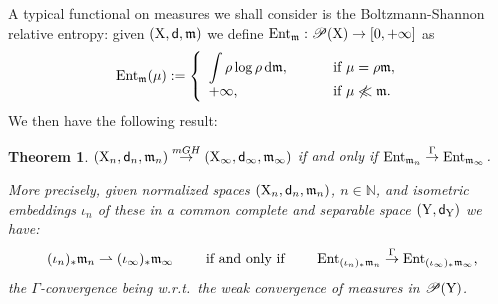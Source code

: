 \documentclass[11pt]{article}
\numberwithin{equation}{section}
\newtheorem{theorem}{Theorem}[section]
\newcommand{\N}{\mathbb{N}}
\newcommand{\pr}{\mathscr P}
\newcommand{\X}{{\rm X}}
\newcommand{\Y}{{\rm Y}}
\newcommand{\sfd}{{\sf d}}
\newcommand{\mm}{{\mathfrak m}}
\newcommand{\ent}{{\rm Ent}_\mm}
\newcommand{\entm}[1]{{\rm Ent}_{#1}}
\renewcommand{\d}{{\rm d}}
\newcommand{\weakto}{\rightharpoonup}
\begin{document}
A typical functional on measures we shall consider is the Boltzmann-Shannon relative entropy: given $(\X,\sfd,\mm)$ we define $\ent:\pr(\X)\to[0,+\infty]$ as
\[
\ent(\mu):=\left\{\begin{array}{ll}
\displaystyle{\int\rho\log\rho\,\d\mm},&\qquad\text{ if }\mu=\rho\mm,\\
+\infty,&\qquad\text{ if }\mu\not\ll\mm.
\end{array}
\right.
\]
We then have the following result:
\begin{theorem}\label{thm:gammamgh}  $(\X_n,\sfd_n,\mm_n)\stackrel{mGH}\to(\X_\infty,\sfd_\infty,\mm_\infty)$ if and only if $\entm{\mm_n}\stackrel{\Gamma}\to \entm{\mm_\infty} $.

More precisely, given normalized spaces $(\X_n,\sfd_n,\mm_n)$, $n\in\N$, and isometric embeddings $\iota_n$ of these in a common complete and separable space $(\Y,\sfd_\Y)$ we have:
%
\[
\text{ $(\iota_n)_*\mm_n\weakto (\iota_\infty)_*\mm_\infty\qquad$ if and only if $\qquad\entm{(\iota_n)_*\mm_n}\stackrel{\Gamma}\to \entm{(\iota_\infty)_*\mm_\infty}$,}
\]
the $\Gamma$-convergence being w.r.t.\ the weak convergence of measures in $\pr(\Y)$.
\end{theorem}
\end{document}
